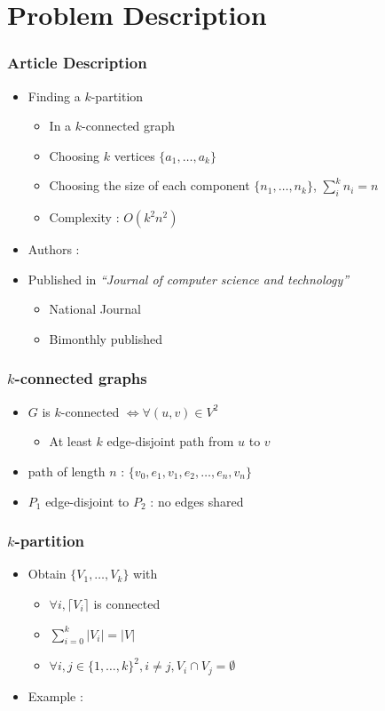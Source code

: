 \documentclass[xcolor=dvipsnames]{beamer}
\begin{document}
\section{Problem Description}

\begin{frame}
  \frametitle{Article Description}
  \begin{itemize}
  \item Finding a $k$-partition
    \begin{itemize}
    \item In a $k$-connected graph
    \item Choosing $k$ vertices $\{a_1, \dots , a_k\}$
    \item Choosing the size of each component $\{n_1, \dots ,n_k\}$,
      $\sum\limits_{i}^k{n_i} = n$
    \item Complexity : $O(k^2 n^2)$
    \end{itemize}
  \item Authors :
  \item Published in {\em ``Journal of computer science and technology''}
    \begin{itemize}
    \item National Journal
    \item Bimonthly published
    \end{itemize}
  \end{itemize}
\end{frame}

\begin{frame}
  \frametitle{$k$-connected graphs}
  \begin{itemize}
    \item $G$ is $k$-connected $\Leftrightarrow \forall (u,v) \in V^2$
      \begin{itemize}
      \item At least $k$ edge-disjoint path from $u$ to $v$
      \end{itemize}
    \item path of length $n$ : $\{v_0,e_1,v_1,e_2, \dots , e_n,v_n\}$
    \item $P_1$ edge-disjoint to $P_2$ : no edges shared
  \end{itemize}
\end{frame}

\begin{frame}
  \frametitle{$k$-partition}
  \begin{itemize}
  \item Obtain $\{V_1, \dots, V_k\}$ with
    \begin{itemize}
    \item $\forall i, \lceil V_i \rceil$ is connected
    \item $\sum\limits_{i=0}^k|V_i| = |V|$
    \item $\forall i,j \in \{1, \dots, k\}^2, i \neq j, V_i \cap V_j = \emptyset$
    \end{itemize}
  \item Example :%
  \end{itemize}
\end{frame}
\end{document}
